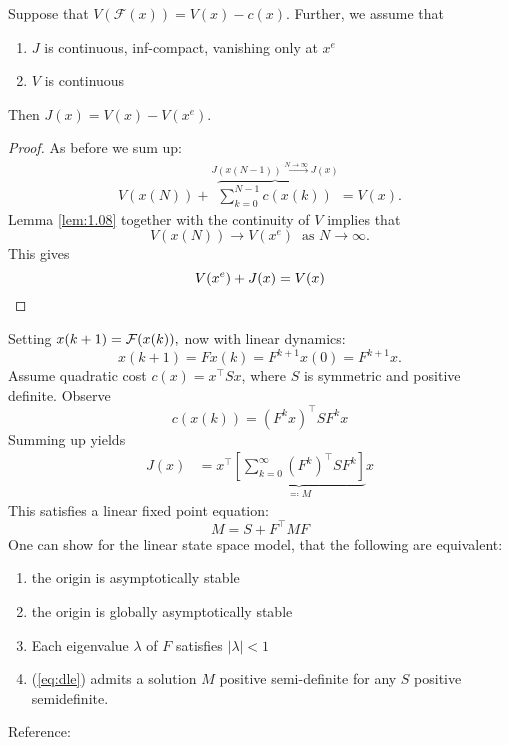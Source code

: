 \begin{proposition}\label{prop:1.12}
    Suppose that \(V(\mathcal{F}(x))=V(x)-c(x)\). Further, we assume that 
    \begin{enumerate}
        \item \(J\) is continuous, inf-compact, vanishing only at \(x^e\)
        \item \(V\) is continuous
    \end{enumerate}
    Then \(J(x)=V(x)-V(x^e)\).
\end{proposition}

\begin{proof}
    As before we sum up:
    \begin{align*}
        V(x(N))+\overbrace{\sum_{k=0}^{N-1}c(x(k))}^{J(x(N-1))\stackrel{N\to\infty}{\to}J(x)}=V(x).
    \end{align*}
    Lemma \ref{lem:1.08} together with the continuity of \(V\) implies that
    \[V(x(N))\to V(x^e)\ \text{ as }N\to\infty.\]
    This gives \[V(x^e)+J(x)=V(x)\qedhere\]
\end{proof}

\begin{example}
    Setting \(x(k+1)=\mathcal{F}(x(k)),\) now with linear dynamics:
    \[x(k+1)=F x(k)=F^{k+1}x(0)=F^{k+1}x.\]
    Assume quadratic cost \(c(x)=x^\intercal S x\), where \(S\) is symmetric and 
    positive definite.
    Observe
    \[c(x(k))=(F^kx)^\intercal S F^k x\]
    Summing up yields 
    \begin{align*}
        J(x)&=x^\intercal \underbrace{\left[\sum_{k=0}^{\infty} (F^k)^\intercal S F^k\right]}_{\eqqcolon M}x
    \end{align*}
    This satisfies a linear fixed point equation:
    \begin{equation}\label{eq:dle}
        M=S+F^\intercal M F
    \end{equation}
    One can show for the linear state space model, that the following are equivalent:
    \begin{enumerate}
        \item the origin is asymptotically stable 
        \item the origin is globally asymptotically stable 
        \item Each eigenvalue \(\lambda\) of \(F\) satisfies \(|\lambda|<1\)
        \item (\ref{eq:dle}) admits a solution \(M\) positive semi-definite for any \(S\) positive semidefinite.
    \end{enumerate}

    Reference: \cite{basar2024lecturenotescontroltheory} %

\end{example}


